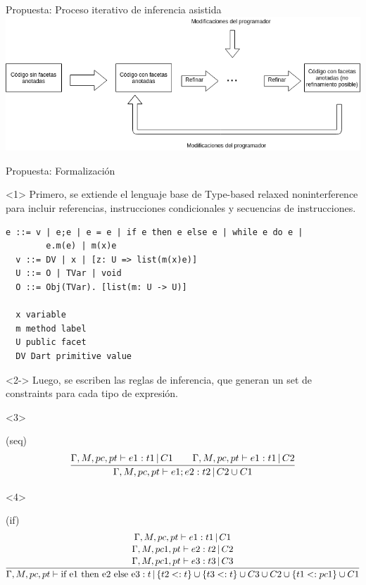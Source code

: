 \documentclass[aspectratio=169,10pt]{beamer}
\begin{document}
\begin{frame}[fragile]{Propuesta: Proceso iterativo de inferencia asistida}
	\includegraphics[width=1.0\textwidth]{img/diagrama.png}
\end{frame}

\begin{frame}[fragile]{Propuesta: Formalización}
  \begin{onlyenv}<1>
    Primero, se extiende el lenguaje base de Type-based relaxed noninterference para incluir referencias, instrucciones condicionales y secuencias de instrucciones.
    \begin{Verbatim}[fontsize=\small]
  e ::= v | e;e | e = e | if e then e else e | while e do e |
        e.m(e) | m(x)e
  v ::= DV | x | [z: U => list(m(x)e)]
  U ::= O | TVar | void
  O ::= Obj(TVar). [list(m: U -> U)]

  x variable
  m method label
  U public facet
  DV Dart primitive value
\end{Verbatim}
  \end{onlyenv}

  \begin{onlyenv}<2->
    Luego, se escriben las reglas de inferencia, que generan un set de constraints para cada tipo de expresión.
  \end{onlyenv}
  \begin{onlyenv}<3>
    \begin{center}
      (seq)
      \[\infer{\Gamma, M, pc, pt \vdash e1;e2 : t2\, |\, C2 \cup C1}{\Gamma, M, pc, pt \vdash e1 : t1\, |\, C1 \qquad \Gamma, M, pc, pt \vdash e1 : t1\, |\, C2}\]
    \end{center}

  \end{onlyenv}

  \begin{onlyenv}<4>
    \begin{center}
      (if)
      \[\infer{\Gamma, M, pc, pt \vdash \text{if e1 then e2 else e3} : t\, |\, \{t2 <: t\} \cup \{t3 <: t\} \cup C3 \cup C2 \cup \{t1 <: pc1\} \cup C1}{\stackanchor{$\Gamma, M, pc, pt \vdash e1 : t1\, |\, C1$}{\stackanchor{$\Gamma, M, pc1, pt \vdash e2 : t2\, |\, C2$}{$\Gamma, M, pc1, pt \vdash e3 : t3\, |\, C3$}}}\]
    \end{center}
  \end{onlyenv}

\end{frame}
\end{document}
